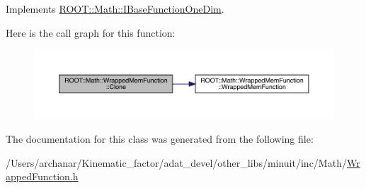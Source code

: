 Implements \mbox{\hyperlink{classROOT_1_1Math_1_1IBaseFunctionOneDim_a656dbb4dfc43e8d1566442bfb1a717fd}{R\+O\+O\+T\+::\+Math\+::\+I\+Base\+Function\+One\+Dim}}.

Here is the call graph for this function\+:
\nopagebreak
\begin{figure}[H]
\begin{center}
\leavevmode
\includegraphics[width=350pt]{dd/df6/classROOT_1_1Math_1_1WrappedMemFunction_a6f27e92240e16003ff20c25df6fba1eb_cgraph}
\end{center}
\end{figure}


The documentation for this class was generated from the following file\+:\begin{DoxyCompactItemize}
\item 
/\+Users/archanar/\+Kinematic\+\_\+factor/adat\+\_\+devel/other\+\_\+libs/minuit/inc/\+Math/\mbox{\hyperlink{other__libs_2minuit_2inc_2Math_2WrappedFunction_8h}{Wrapped\+Function.\+h}}\end{DoxyCompactItemize}
